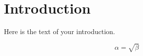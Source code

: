 \section{Introduction}
Here is the text of your introduction.

\begin{equation}
    \label{simple_equation}
    \alpha = \sqrt{ \beta }
\end{equation}